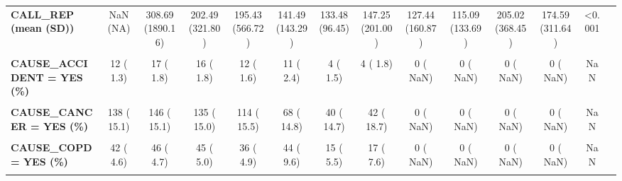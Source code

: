 \documentclass[
]{article}
\begin{document}
\begin{table}[H]
\begin{tabular}[t]{>{\raggedright\arraybackslash}p{5em}ccccccccccccc}
\textbf{CALL\_REP (mean (SD))} & NaN (NA) & 308.69 (1890.16) & 202.49 (321.80) & 195.43 (566.72) & 141.49 (143.29) & 133.48 (96.45) & 147.25 (201.00) & 127.44 (160.87) & 115.09 (133.69) & 205.02 (368.45) & 174.59 (311.64) & <0.001 & \\
\textbf{\cellcolor{gray!10}{CARBL = YES (\%)}} & \cellcolor{gray!10}{0 (  NaN)} & \cellcolor{gray!10}{0 (  NaN)} & \cellcolor{gray!10}{138 (  6.7)} & \cellcolor{gray!10}{0 (  NaN)} & \cellcolor{gray!10}{140 (  8.1)} & \cellcolor{gray!10}{154 (  8.7)} & \cellcolor{gray!10}{239 ( 12.8)} & \cellcolor{gray!10}{275 ( 18.4)} & \cellcolor{gray!10}{272 ( 31.8)} & \cellcolor{gray!10}{271 ( 15.5)} & \cellcolor{gray!10}{238 ( 13.6)} & \cellcolor{gray!10}{NaN} & \cellcolor{gray!10}{}\\
\textbf{CAUSE\_ACCIDENT = YES (\%)} & 12 (  1.3) & 17 (  1.8) & 16 (  1.8) & 12 (  1.6) & 11 (  2.4) & 4 (  1.5) & 4 (  1.8) & 0 (  NaN) & 0 (  NaN) & 0 (  NaN) & 0 (  NaN) & NaN & \\
\textbf{\cellcolor{gray!10}{CAUSE\_BENIGN = YES (\%)}} & \cellcolor{gray!10}{5 (  0.5)} & \cellcolor{gray!10}{7 (  0.7)} & \cellcolor{gray!10}{6 (  0.7)} & \cellcolor{gray!10}{8 (  1.1)} & \cellcolor{gray!10}{4 (  0.9)} & \cellcolor{gray!10}{0 (  0.0)} & \cellcolor{gray!10}{2 (  0.9)} & \cellcolor{gray!10}{0 (  NaN)} & \cellcolor{gray!10}{0 (  NaN)} & \cellcolor{gray!10}{0 (  NaN)} & \cellcolor{gray!10}{0 (  NaN)} & \cellcolor{gray!10}{NaN} & \cellcolor{gray!10}{}\\
\textbf{CAUSE\_CANCER = YES (\%)} & 138 ( 15.1) & 146 ( 15.1) & 135 ( 15.0) & 114 ( 15.5) & 68 ( 14.8) & 40 ( 14.7) & 42 ( 18.7) & 0 (  NaN) & 0 (  NaN) & 0 (  NaN) & 0 (  NaN) & NaN & \\
\textbf{\cellcolor{gray!10}{CAUSE\_CONGENITAL = YES (\%)}} & \cellcolor{gray!10}{1 (  0.1)} & \cellcolor{gray!10}{0 (  0.0)} & \cellcolor{gray!10}{1 (  0.1)} & \cellcolor{gray!10}{2 (  0.3)} & \cellcolor{gray!10}{0 (  0.0)} & \cellcolor{gray!10}{1 (  0.4)} & \cellcolor{gray!10}{0 (  0.0)} & \cellcolor{gray!10}{0 (  NaN)} & \cellcolor{gray!10}{0 (  NaN)} & \cellcolor{gray!10}{0 (  NaN)} & \cellcolor{gray!10}{0 (  NaN)} & \cellcolor{gray!10}{NaN} & \cellcolor{gray!10}{}\\
\textbf{CAUSE\_COPD = YES (\%)} & 42 (  4.6) & 46 (  4.7) & 45 (  5.0) & 36 (  4.9) & 44 (  9.6) & 15 (  5.5) & 17 (  7.6) & 0 (  NaN) & 0 (  NaN) & 0 (  NaN) & 0 (  NaN) & NaN & \\
\textbf{\cellcolor{gray!10}{CAUSE\_CVA = YES (\%)}} & \cellcolor{gray!10}{87 (  9.5)} & \cellcolor{gray!10}{97 ( 10.0)} & \cellcolor{gray!10}{93 ( 10.3)} & \cellcolor{gray!10}{83 ( 11.3)} & \cellcolor{gray!10}{54 ( 11.8)} & \cellcolor{gray!10}{35 ( 12.8)} & \cellcolor{gray!10}{21 (  9.3)} & \cellcolor{gray!10}{0 (  NaN)} & \cellcolor{gray!10}{0 (  NaN)} & \cellcolor{gray!10}{0 (  NaN)} & \cellcolor{gray!10}{0 (  NaN)} & \cellcolor{gray!10}{NaN} & \cellcolor{gray!10}{}\\

\end{tabular}
\end{table}
\end{document}

